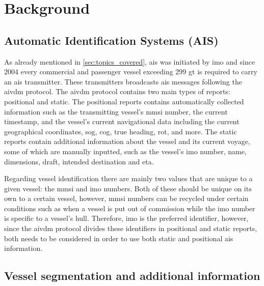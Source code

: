 \chapter{Background}

\section{Automatic Identification Systems (AIS)}

As already mentioned in \cref{sec:topics_covered}, \acrfull{ais} was initiated by \acrfull{imo} and since 2004 every commercial and passenger vessel exceeding 299 \acrfull{gt} is required to carry an \acrshort{ais} transmitter. These transmitters broadcasts \acrshort{ais} messages following the \gls{aivdm} protocol. The \gls{aivdm} protocol contains two main types of reports: positional and static. The positional reports contains automatically collected information such as the transmitting vessel's \acrfull{mmsi} number, the current timestamp, and the vessel's current navigational data including the current geographical coordinates, \acrfull{sog}, \acrfull{cog}, true heading, \acrfull{rot}, and more. The static reports contain additional information about the vessel and its current voyage, some of which are manually inputted, such as the vessel's \acrshort{imo} number, name, dimensions, draft, intended destination and \acrfull{eta}.

Regarding vessel identification there are mainly two values that are unique to a given vessel: the \acrshort{mmsi} and \acrshort{imo} numbers. Both of these should be unique on its own to a certain vessel, however, \acrshort{mmsi} numbers can be recycled under certain conditions such as when a vessel is put out of commission while the \acrshort{imo} number is specific to a vessel's hull. Therefore, \acrshort{imo} is the preferred identifier, however, since the \gls{aivdm} protocol divides these identifiers in positional and static reports, both needs to be considered in order to use both static and positional \acrshort{ais} information.


\section{Vessel segmentation and additional information}

